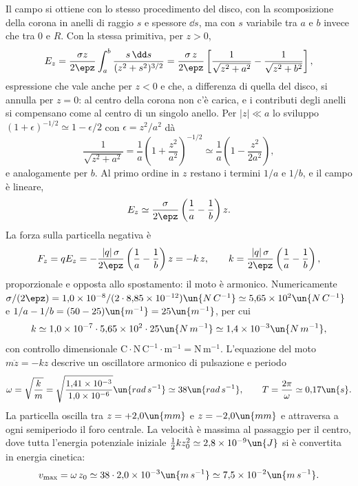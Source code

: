 \documentclass[main.tex]{subfiles}
\begin{document}
Il campo si ottiene con lo stesso procedimento del disco, con la scomposizione della corona in anelli di raggio $s$ e spessore $\dd s$, ma con $s$ variabile tra $a$ e $b$ invece che tra $0$ e $R$. Con la stessa primitiva, per $z>0$,
\[
E_z=\frac{\sigma z}{2\epz}\int_a^b\frac{s\,\dd s}{(z^2+s^2)^{3/2}}=\frac{\sigma\,z}{2\epz}\left[\frac{1}{\sqrt{z^2+a^2}}-\frac{1}{\sqrt{z^2+b^2}}\right] ,
\]
espressione che vale anche per $z<0$ e che, a differenza di quella del disco, si annulla per $z=0$: al centro della corona non c'è carica, e i contributi degli anelli si compensano come al centro di un singolo anello. Per $|z|\ll a$ lo sviluppo $(1+\epsilon)^{-1/2}\simeq1-\epsilon/2$ con $\epsilon=z^2/a^2$ dà
\[
\frac{1}{\sqrt{z^2+a^2}}=\frac1a\left(1+\frac{z^2}{a^2}\right)^{-1/2}\simeq\frac1a\left(1-\frac{z^2}{2a^2}\right),
\]
e analogamente per $b$. Al primo ordine in $z$ restano i termini $1/a$ e $1/b$, e il campo è lineare,
\[
E_z\simeq\frac{\sigma}{2\epz}\left(\frac1a-\frac1b\right)z .
\]
La forza sulla particella negativa è
\[
F_z=qE_z=-\frac{|q|\,\sigma}{2\epz}\left(\frac1a-\frac1b\right)z=-k\,z,
\qquad
k=\frac{|q|\,\sigma}{2\epz}\left(\frac1a-\frac1b\right) ,
\]
proporzionale e opposta allo spostamento: il moto è armonico. Numericamente $\sigma/(2\epz)=1{,}0\times10^{-8}/(2\cdot8{,}85\times10^{-12})\un{N\,C^{-1}}\simeq5{,}65\times10^{2}\un{N\,C^{-1}}$ e $1/a-1/b=(50-25)\un{m^{-1}}=25\un{m^{-1}}$, per cui
\[
k\simeq1{,}0\times10^{-7}\cdot5{,}65\times10^{2}\cdot25\un{N\,m^{-1}}\simeq1{,}4\times10^{-3}\un{N\,m^{-1}} ,
\]
con controllo dimensionale $\mathrm{C}\cdot\mathrm{N\,C^{-1}}\cdot\mathrm{m^{-1}}=\mathrm{N\,m^{-1}}$. L'equazione del moto $m\ddot z=-kz$ descrive un oscillatore armonico di pulsazione e periodo
\[
\omega=\sqrt{\frac{k}{m}}=\sqrt{\frac{1{,}41\times10^{-3}}{1{,}0\times10^{-6}}}\un{rad\,s^{-1}}\simeq 38\un{rad\,s^{-1}},\qquad
T=\frac{2\pi}{\omega}\simeq 0{,}17\un{s} .
\]
La particella oscilla tra $z=+2{,}0\un{mm}$ e $z=-2{,}0\un{mm}$ e attraversa a ogni semiperiodo il foro centrale. La velocità è massima al passaggio per il centro, dove tutta l'energia potenziale iniziale $\tfrac12kz_0^2\simeq2{,}8\times10^{-9}\un{J}$ si è convertita in energia cinetica:
\[
v_{\max}=\omega\,z_0\simeq38\cdot2{,}0\times10^{-3}\un{m\,s^{-1}}\simeq7{,}5\times10^{-2}\un{m\,s^{-1}} .
\]
\end{document}
